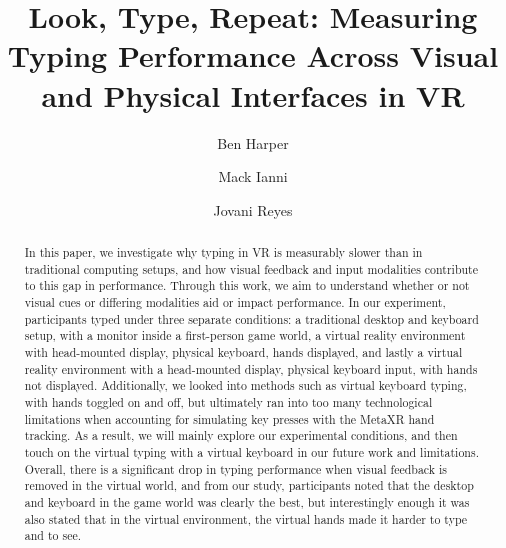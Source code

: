 \documentclass[acmlarge]{acmart}
\begin{document}


\title[Look, Type, Repeat]{Look, Type, Repeat: Measuring Typing Performance Across Visual and Physical Interfaces in VR}

\author{Ben Harper}

\author{Mack Ianni}

\author{Jovani Reyes}

\renewcommand{\shortauthors}{Jovani Reyes, Ben Harper, Mack Ianni}


\renewcommand{\shortauthors}{Reyes, Ianni, and Harper}

\begin{abstract}
In this paper, we investigate why typing in VR is measurably slower than in traditional computing setups, and how visual feedback and input modalities contribute to this gap in performance. Through this work, we aim to understand whether or not visual cues or differing modalities aid or impact performance. In our experiment, participants typed under three separate conditions: a traditional desktop and keyboard setup, with a monitor inside a first-person game world, a virtual reality environment with head-mounted display, physical keyboard, hands displayed, and lastly a virtual reality environment with a head-mounted display, physical keyboard input, with hands not displayed. Additionally, we looked into methods such as virtual keyboard typing, with hands toggled on and off, but ultimately ran into too many technological limitations when accounting for simulating key presses with the MetaXR hand tracking. As a result, we will mainly explore our experimental conditions, and then touch on the virtual typing with a virtual keyboard in our future work and limitations. Overall, there is a significant drop in typing performance when visual feedback is removed in the virtual world, and from our study, participants noted that the desktop and keyboard in the game world was clearly the best, but interestingly enough it was also stated that in the virtual environment, the virtual hands made it harder to type and to see. 
\end{abstract}
\end{document}
